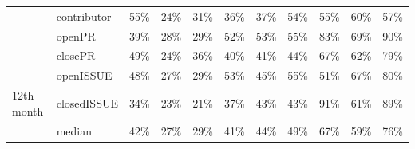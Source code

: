 \documentclass[smallextended]{svjour3}
\begin{document}
\begin{table}[!t]
{\begin{tabular}{llccccccccc}
                                     & contributor                          & \cellcolor[HTML]{BABABA}55\% & \cellcolor[HTML]{EAEAEA}24\% & \cellcolor[HTML]{E0E0E0}31\% & \cellcolor[HTML]{DADADA}36\% & \cellcolor[HTML]{D9D9D9}37\% & \cellcolor[HTML]{BBBBBB}54\% & \cellcolor[HTML]{BABABA}55\% & \cellcolor[HTML]{AEAEAE}60\% & \cellcolor[HTML]{B5B5B5}57\% \\
                                     & openPR                               & \cellcolor[HTML]{D5D5D5}39\% & \cellcolor[HTML]{E5E5E5}28\% & \cellcolor[HTML]{E3E3E3}29\% & \cellcolor[HTML]{BFBFBF}52\% & \cellcolor[HTML]{BDBDBD}53\% & \cellcolor[HTML]{B9B9B9}55\% & \cellcolor[HTML]{7B7B7B}83\% & \cellcolor[HTML]{9A9A9A}69\% & \cellcolor[HTML]{6B6B6B}90\% \\
                                     & closePR                              & \cellcolor[HTML]{C7C7C7}49\% & \cellcolor[HTML]{EBEBEB}24\% & \cellcolor[HTML]{DADADA}36\% & \cellcolor[HTML]{D5D5D5}40\% & \cellcolor[HTML]{D3D3D3}41\% & \cellcolor[HTML]{CFCFCF}44\% & \cellcolor[HTML]{9E9E9E}67\% & \cellcolor[HTML]{A9A9A9}62\% & \cellcolor[HTML]{848484}79\% \\
                                     & openISSUE                            & \cellcolor[HTML]{C9C9C9}48\% & \cellcolor[HTML]{E6E6E6}27\% & \cellcolor[HTML]{E3E3E3}29\% & \cellcolor[HTML]{BEBEBE}53\% & \cellcolor[HTML]{CDCDCD}45\% & \cellcolor[HTML]{B9B9B9}55\% & \cellcolor[HTML]{C1C1C1}51\% & \cellcolor[HTML]{9E9E9E}67\% & \cellcolor[HTML]{808080}80\% \\
\multirow{-6}{*}{12th month}         & closedISSUE                          & \cellcolor[HTML]{DCDCDC}34\% & \cellcolor[HTML]{EBEBEB}23\% & \cellcolor[HTML]{EEEEEE}21\% & \cellcolor[HTML]{D9D9D9}37\% & \cellcolor[HTML]{D1D1D1}43\% & \cellcolor[HTML]{D1D1D1}43\% & \cellcolor[HTML]{696969}91\% & \cellcolor[HTML]{ABABAB}61\% & \cellcolor[HTML]{6D6D6D}89\% \\ \hline
                                     & \cellcolor[HTML]{FFFFFF}median       & \cellcolor[HTML]{FFFFFF}42\% & \cellcolor[HTML]{FFFFFF}27\% & \cellcolor[HTML]{FFFFFF}29\% & \cellcolor[HTML]{FFFFFF}41\% & \cellcolor[HTML]{FFFFFF}44\% & \cellcolor[HTML]{FFFFFF}49\% & \cellcolor[HTML]{FFFFFF}67\% & \cellcolor[HTML]{FFFFFF}59\% & \cellcolor[HTML]{FFFFFF}76\%
\end{tabular}
}
\end{table}
\end{document}
